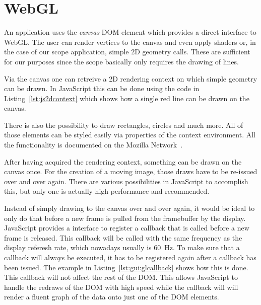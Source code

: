 \section{WebGL} %
\label{sec:app:gui:webgl}

An  application uses  the \emph{canvas}  DOM element  which provides  a direct
interface to WebGL. The user can render  vertices to the canvas and even apply
shaders  or,  in  the  case  of our  scope  application,  simple  2D  geometry
calls. These are  sufficient for our  purposes since the scope  basically only
requires the drawing of lines.

Via  the canvas  one  can retreive  a  2D rendering  context  on which  simple
geometry can  be drawn.   In JavaScript  this can  be done  using the  code in
Listing~\ref{lst:js2dcontext} which shows  how a single red line  can be drawn
on the canvas.


There  is  also   the  possibility  to  draw  rectangles,   circles  and  much
more. All  of those  elements  can  be styled  easily  via  properties of  the
context  environment. All  the  functionality  is documented  on  the  Mozilla
Network~\cite{moz:2dcontext}.

After having  acquired the rendering  context, something  can be drawn  on the
canvas once.   For the  creation of  a moving  image, those  draws have  to be
re-issued over and  over again. There are various  possibilities in JavaScript
to accomplish this, but only one is actually high-performance and recommended.

Instead of simply drawing to the canvas over and over again, it would be ideal
to only  do that  before a  new frame is  pulled from  the framebuffer  by the
display. JavaScript provides a interface to register a callback that is called
before  a  new frame  is  released. This  callback  will  be called  with  the
same  frequency  as the  display  referesh  rate,  which nowadays  usually  is
\SI{60}{\hertz}.  To make sure that a callback will always be executed, it has
to  be registered  again  after a  callback has  been  issued. The example  in
Listing~\ref{lst:gui:glcallback} shows  how this is done.   This callback will
not affect the  rest of the DOM. This allows JavaScript  to handle the redraws
of the DOM with high speed while  the callback will will render a fluent graph
of the data onto just one of the DOM elements.

